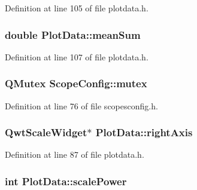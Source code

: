 \-Definition at line 105 of file plotdata.\-h.

\hypertarget{group___scope_plugin_ga619dc668a50f1123f71de7baa4dc5f9c}{
\subsubsection[{mean\-Sum}]{\setlength{\rightskip}{0pt plus 5cm}double {\bf \-Plot\-Data\-::mean\-Sum}}}\label{group___scope_plugin_ga619dc668a50f1123f71de7baa4dc5f9c}


\-Definition at line 107 of file plotdata.\-h.

\hypertarget{group___scope_plugin_ga482a0dd2b656ddf480def36bacca8aac}{
\subsubsection[{mutex}]{\setlength{\rightskip}{0pt plus 5cm}\-Q\-Mutex {\bf \-Scope\-Config\-::mutex}}}\label{group___scope_plugin_ga482a0dd2b656ddf480def36bacca8aac}


\-Definition at line 76 of file scopesconfig.\-h.

\hypertarget{group___scope_plugin_gad0b4661f32046ccf0ab49100be76c1b3}{
\subsubsection[{right\-Axis}]{\setlength{\rightskip}{0pt plus 5cm}\-Qwt\-Scale\-Widget$\ast$ {\bf \-Plot\-Data\-::right\-Axis}}}\label{group___scope_plugin_gad0b4661f32046ccf0ab49100be76c1b3}


\-Definition at line 87 of file plotdata.\-h.

\hypertarget{group___scope_plugin_gad4b115ab449c4276ef15d3e2862e6280}{
\subsubsection[{scale\-Power}]{\setlength{\rightskip}{0pt plus 5cm}int {\bf \-Plot\-Data\-::scale\-Power}}}\label{group___scope_plugin_gad4b115ab449c4276ef15d3e2862e6280}


